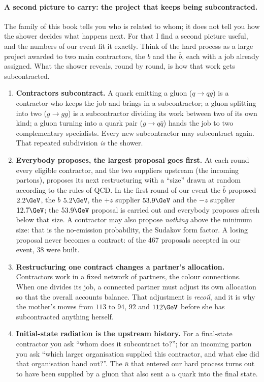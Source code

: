 \paragraph{A second picture to carry: the project that keeps being
subcontracted.} The family of this book tells you who is related to whom;
it does not tell you how the shower decides what happens next. For that I
find a second picture useful, and the numbers of our event fit it exactly.
Think of the hard process as a large project awarded to two main
contractors, the $b$ and the $\bar b$, each with a job already assigned.
What the shower reveals, round by round, is how that work gets
subcontracted.
\begin{enumerate}[nosep]
  \item \textbf{Contractors subcontract.} A quark emitting a gluon
    ($q\to qg$) is a contractor who keeps the job and brings in a
    subcontractor; a gluon splitting into two ($g\to gg$) is a
    subcontractor dividing its work between two of its own kind; a gluon
    turning into a quark pair ($g\to q\bar q$) hands the job to two
    complementary specialists. Every new subcontractor may subcontract
    again. That repeated subdivision \emph{is} the shower.
  \item \textbf{Everybody proposes, the largest proposal goes first.} At
    each round every eligible contractor, and the two suppliers upstream
    (the incoming partons), proposes its next restructuring with a
    ``size'' drawn at random according to the rules of QCD. In the first
    round of our event the $\bar b$ proposed $2.2\GeV$, the $b$ $5.2\GeV$,
    the $+z$ supplier $53.9\GeV$ and the $-z$ supplier $12.7\GeV$; the
    $53.9\GeV$ proposal is carried out and everybody proposes afresh below
    that size. A contractor may also propose \emph{nothing} above the
    minimum size: that is the no-emission probability, the Sudakov form
    factor. A losing proposal never becomes a contract: of the 467
    proposals accepted in our event, 38 were built.
  \item \textbf{Restructuring one contract changes a partner's
    allocation.} Contractors work in a fixed network of partners, the
    colour connections. When one divides its job, a connected partner must
    adjust its own allocation so that the overall accounts balance. That
    adjustment is \emph{recoil}, and it is why the mother's \pt moves from
    $113$ to $94$, $92$ and $112\GeV$ before she has subcontracted anything
    herself.
  \item \textbf{Initial-state radiation is the upstream history.} For a
    final-state contractor you ask ``whom does it subcontract to?''; for an
    incoming parton you ask ``which larger organisation supplied this
    contractor, and what else did that organisation hand out?''. The $\bar u$
    that entered our hard process turns out to have been supplied by a
    gluon that also sent a $u$ quark into the final state.
\end{enumerate}
